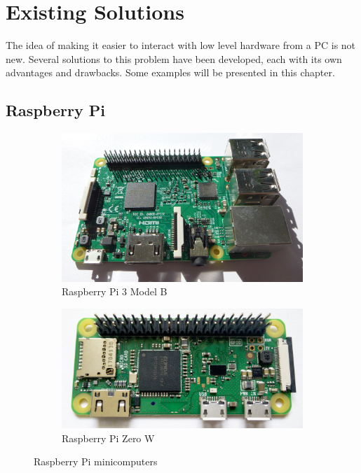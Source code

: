 \chapter{\label{sec:prior-art}Existing Solutions}

The idea of making it easier to interact with low level hardware from a PC is not new. Several solutions to this problem have been developed, each with its own advantages and drawbacks. Some examples will be presented in this chapter.

\section{Raspberry Pi}

\begin{figure}[H]
	\centering
	\begin{subfigure}{.5\textwidth}
		\centering
		\includegraphics[width=.95\textwidth] {img/pi3-photo.jpg}
		\caption{Raspberry Pi 3 Model B}
	\end{subfigure}%
	\begin{subfigure}{.5\textwidth}
		\centering
		\includegraphics[width=.95\textwidth] {img/pi0.jpg}
		\caption{Raspberry Pi Zero W}
	\end{subfigure}
	\caption{\label{fig:rpi}Raspberry Pi minicomputers}
\end{figure}

